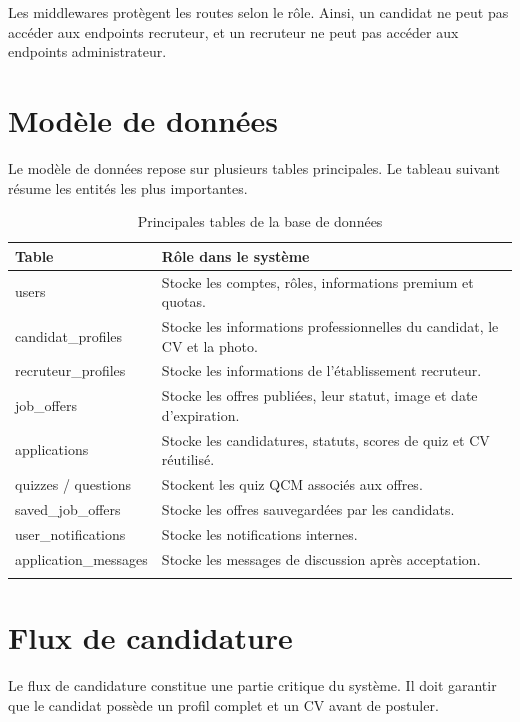 \noindent
Les middlewares protègent les routes selon le rôle. Ainsi, un candidat ne peut pas accéder aux endpoints recruteur, et un recruteur ne peut pas accéder aux endpoints administrateur.

\section{Modèle de données}

\noindent
Le modèle de données repose sur plusieurs tables principales. Le tableau suivant résume les entités les plus importantes.

\begin{longtable}{|p{4cm}|p{9cm}|}
\hline
\textbf{Table} & \textbf{Rôle dans le système} \\
\hline
\endhead
users & Stocke les comptes, rôles, informations premium et quotas. \\
\hline
candidat\_profiles & Stocke les informations professionnelles du candidat, le CV et la photo. \\
\hline
recruteur\_profiles & Stocke les informations de l'établissement recruteur. \\
\hline
job\_offers & Stocke les offres publiées, leur statut, image et date d'expiration. \\
\hline
applications & Stocke les candidatures, statuts, scores de quiz et CV réutilisé. \\
\hline
quizzes / questions & Stockent les quiz QCM associés aux offres. \\
\hline
saved\_job\_offers & Stocke les offres sauvegardées par les candidats. \\
\hline
user\_notifications & Stocke les notifications internes. \\
\hline
application\_messages & Stocke les messages de discussion après acceptation. \\
\hline
\caption{Principales tables de la base de données}
\label{tab:tables_bd}
\end{longtable}


\section{Flux de candidature}

\noindent
Le flux de candidature constitue une partie critique du système. Il doit garantir que le candidat possède un profil complet et un CV avant de postuler.

